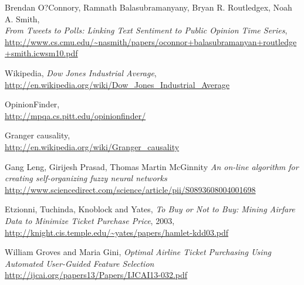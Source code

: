 \documentclass[minf,frontabs,twoside,singlespacing,parskip]{infthesis}
\begin{document}
\begin{thebibliography}{10}
	Brendan O?Connory,  Ramnath Balasubramanyany, Bryan R. Routledgex, Noah A. Smith, \\  
	\emph{From Tweets to Polls: Linking Text Sentiment to Public Opinion Time Series}, \\
	{\url{http://www.cs.cmu.edu/~nasmith/papers/oconnor+balasubramanyan+routledge+smith.icwsm10.pdf}}

	Wikipedia, \emph{Dow Jones Industrial Average}, \\
	{\url{http://en.wikipedia.org/wiki/Dow_Jones_Industrial_Average}}

	OpinionFinder, \\
	{\url{http://mpqa.cs.pitt.edu/opinionfinder/}}
	
	Granger causality, \\
	{\url{http://en.wikipedia.org/wiki/Granger_causality}}

	Gang Leng, Girijesh Prasad, Thomas Martin McGinnity
	\emph{An on-line algorithm for creating self-organizing fuzzy neural networks}
	{\url{http://www.sciencedirect.com/science/article/pii/S0893608004001698}}
  
 	Etzionni, Tuchinda, Knoblock and Yates, \emph{To Buy or Not to Buy: Mining Airfare Data to Minimize Ticket Purchase Price}, 2003, \\
  	{\url{http://knight.cis.temple.edu/~yates/papers/hamlet-kdd03.pdf}}
	
	William Groves and Maria Gini, \emph{Optimal Airline Ticket Purchasing Using Automated User-Guided Feature Selection} \\
	{\url{http://ijcai.org/papers13/Papers/IJCAI13-032.pdf}}

\end{thebibliography}
\end{document}
